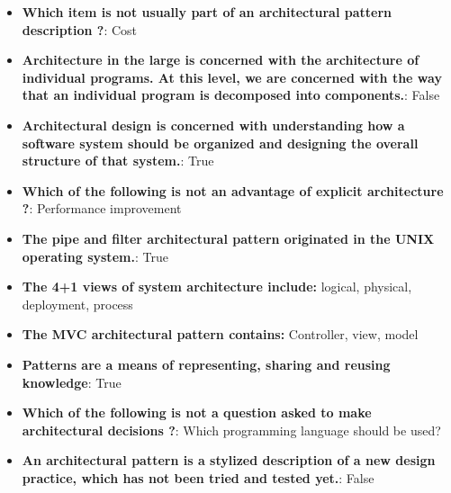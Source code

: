\documentclass{report}
\begin{document}
    \pagebreak 
    \begin{itemize}
        \item \textbf{Which item is not usually part of an architectural pattern description ?}: Cost
        \item \textbf{Architecture in the large is concerned with the architecture of individual programs. At this level, we are concerned with the way that an individual program is decomposed into components.}: False
        \item \textbf{Architectural design is concerned with understanding how a software system should be organized and designing the overall structure of that system.}: True
        \item \textbf{Which of the following is not an advantage of explicit architecture ?}: Performance improvement
        \item \textbf{The pipe and filter architectural pattern originated in the UNIX operating system.}: True
        \item \textbf{The 4+1 views of system architecture include:} logical, physical, deployment, process
        \item \textbf{The MVC architectural pattern contains:} Controller, view, model
        \item \textbf{Patterns are a means of representing, sharing and reusing knowledge}: True
        \item \textbf{Which of the following is not a question asked to make architectural decisions ?}: Which programming language should be used?
        \item \textbf{An architectural pattern is a stylized description of a new design practice, which has not been tried and tested yet.}: False
    \end{itemize}
\end{document}
